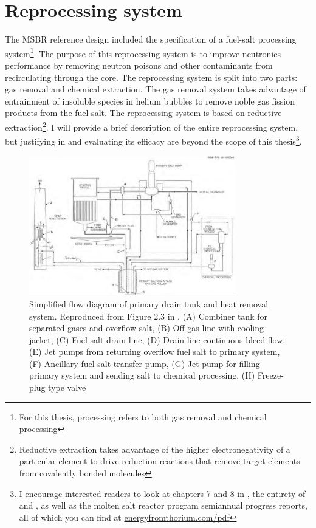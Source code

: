 \section{Reprocessing system}
\label{sec:msbr-reprocessing-system}
The MSBR reference design included the specification of a fuel-salt processing
system\footnote{For this thesis, processing refers to both gas removal and
chemical processing}. The purpose of this reprocessing system is to improve
neutronics performance by removing neutron poisons and other contaminants from
recirculating through the core. The reprocessing system is split into two parts:
gas removal and chemical extraction. The gas removal system takes advantage
of entrainment of insoluble species in helium bubbles to remove noble gas
fission products from the fuel salt. The reprocessing system is based on
reductive extraction\footnote{Reductive extraction takes advantage of the higher
electronegativity of a particular element to drive reduction reactions that
remove target elements from covalently bonded molecules}. I will provide a brief
description of the entire reprocessing system, but justifying in and evaluating
its efficacy are beyond the scope of this thesis\footnote{I encourage interested
readers to look at chapters 7 and 8 in \cite{robertson_conceptual_1971}, the
entirety of \cite{carter_design_1972} and \cite{lindauer_design_1969}, as well
as the molten salt reactor program semiannual progress reports, all of which you
can find at \url{energyfromthorium.com/pdf}}.

\begin{figure}[htpb]
    \centering
    \includegraphics[width=0.8\textwidth]{figs/ch4/msbr_primary_system.png}
    \caption[Simplified flow diagram of primary drain tank and heat removal
    system.]{Simplified flow diagram of primary drain tank and heat removal
    system. Reproduced from Figure 2.3 in \cite{robertson_conceptual_1971}. (A)
    Combiner tank for separated gases and overflow salt, (B) Off-gas line with
    cooling jacket, (C) Fuel-salt drain line, (D) Drain line continuous bleed
    flow, (E) Jet pumps from returning overflow fuel salt to primary system, (F)
    Ancillary fuel-salt transfer pump, (G) Jet pump for filling primary system
    and sending salt to chemical processing, (H) Freeze-plug type valve }
    \label{fig:msbr_primary_system}
\end{figure}

